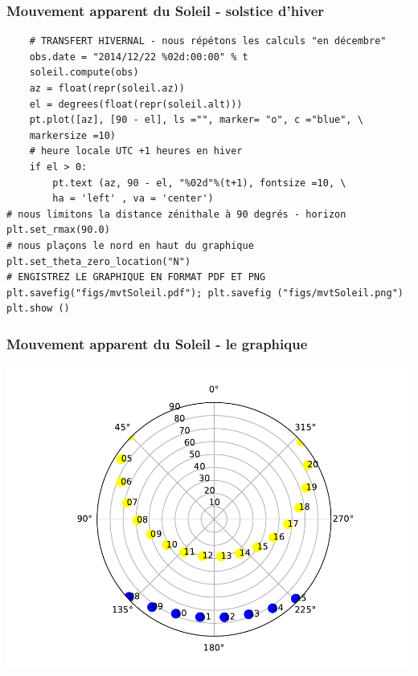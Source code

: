 \documentclass{beamer}
\begin{document}
\begin{frame}
\frametitle{Mouvement apparent du Soleil - solstice d'hiver}

\begin{verbatim}
    # TRANSFERT HIVERNAL - nous répétons les calculs "en décembre"
    obs.date = "2014/12/22 %02d:00:00" % t
    soleil.compute(obs)
    az = float(repr(soleil.az))
    el = degrees(float(repr(soleil.alt)))
    pt.plot([az], [90 - el], ls ="", marker= "o", c ="blue", \
    markersize =10)
    # heure locale UTC +1 heures en hiver
    if el > 0:
        pt.text (az, 90 - el, "%02d"%(t+1), fontsize =10, \
        ha = 'left' , va = 'center')
# nous limitons la distance zénithale à 90 degrés - horizon
plt.set_rmax(90.0)
# nous plaçons le nord en haut du graphique
plt.set_theta_zero_location("N")
# ENGISTREZ LE GRAPHIQUE EN FORMAT PDF ET PNG
plt.savefig("figs/mvtSoleil.pdf"); plt.savefig ("figs/mvtSoleil.png")
plt.show ()
\end{verbatim}
\end{frame}

\begin{frame}
\frametitle{Mouvement apparent du Soleil - le graphique}

\vspace{6mm}

\centerline{\includegraphics[width=0.9\linewidth]{figs/mvtSoleil.pdf}}

\vspace{6mm}
\end{frame}
\end{document}
